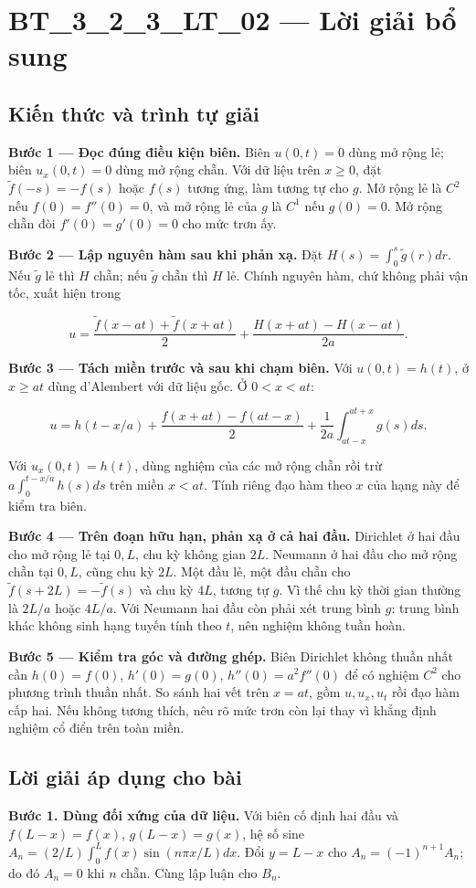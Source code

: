 \documentclass[10pt,a4paper]{article}
\begin{document}
\section*{BT\_3\_2\_3\_LT\_02 — Lời giải bổ sung}
\subsection*{Kiến thức và trình tự giải}
\textbf{Bước 1 — Đọc đúng điều kiện biên.} Biên $u(0,t)=0$ dùng mở rộng lẻ; biên $u_x(0,t)=0$ dùng mở rộng chẵn. Với dữ liệu trên $x\ge0$, đặt $\widetilde f(-s)=-f(s)$ hoặc $f(s)$ tương ứng, làm tương tự cho $g$. Mở rộng lẻ là $C^2$ nếu $f(0)=f''(0)=0$, và mở rộng lẻ của $g$ là $C^1$ nếu $g(0)=0$. Mở rộng chẵn đòi $f'(0)=g'(0)=0$ cho mức trơn ấy.

\textbf{Bước 2 — Lập nguyên hàm sau khi phản xạ.} Đặt $H(s)=\int_0^s\widetilde g(r)dr$. Nếu $\widetilde g$ lẻ thì $H$ chẵn; nếu $\widetilde g$ chẵn thì $H$ lẻ. Chính nguyên hàm, chứ không phải vận tốc, xuất hiện trong


\[
u=\frac{\widetilde f(x-at)+\widetilde f(x+at)}2+\frac{H(x+at)-H(x-at)}{2a}.
\]


\textbf{Bước 3 — Tách miền trước và sau khi chạm biên.} Với $u(0,t)=h(t)$, ở $x\ge at$ dùng d'Alembert với dữ liệu gốc. Ở $0<x<at$:


\[
u=h(t-x/a)+\frac{f(x+at)-f(at-x)}2+\frac1{2a}\int_{at-x}^{at+x}g(s)ds.
\]


Với $u_x(0,t)=h(t)$, dùng nghiệm của các mở rộng chẵn rồi trừ $a\int_0^{t-x/a}h(s)ds$ trên miền $x<at$. Tính riêng đạo hàm theo $x$ của hạng này để kiểm tra biên.

\textbf{Bước 4 — Trên đoạn hữu hạn, phản xạ ở cả hai đầu.} Dirichlet ở hai đầu cho mở rộng lẻ tại $0,L$, chu kỳ không gian $2L$. Neumann ở hai đầu cho mở rộng chẵn tại $0,L$, cũng chu kỳ $2L$. Một đầu lẻ, một đầu chẵn cho $\widetilde f(s+2L)=-\widetilde f(s)$ và chu kỳ $4L$, tương tự $g$. Vì thế chu kỳ thời gian thường là $2L/a$ hoặc $4L/a$. Với Neumann hai đầu còn phải xét trung bình $g$: trung bình khác không sinh hạng tuyến tính theo $t$, nên nghiệm không tuần hoàn.

\textbf{Bước 5 — Kiểm tra góc và đường ghép.} Biên Dirichlet không thuần nhất cần $h(0)=f(0)$, $h'(0)=g(0)$, $h''(0)=a^2f''(0)$ để có nghiệm $C^2$ cho phương trình thuần nhất. So sánh hai vết trên $x=at$, gồm $u,u_x,u_t$ rồi đạo hàm cấp hai. Nếu không tương thích, nêu rõ mức trơn còn lại thay vì khẳng định nghiệm cổ điển trên toàn miền.
\subsection*{Lời giải áp dụng cho bài}
\textbf{Bước 1. Dùng đối xứng của dữ liệu.} Với biên cố định hai đầu và $f(L-x)=f(x)$, $g(L-x)=g(x)$, hệ số sine $A_n=(2/L)\int_0^Lf(x)\sin(n\pi x/L)dx$. Đổi $y=L-x$ cho $A_n=(-1)^{n+1}A_n$; do đó $A_n=0$ khi $n$ chẵn. Cùng lập luận cho $B_n$.
\end{document}
